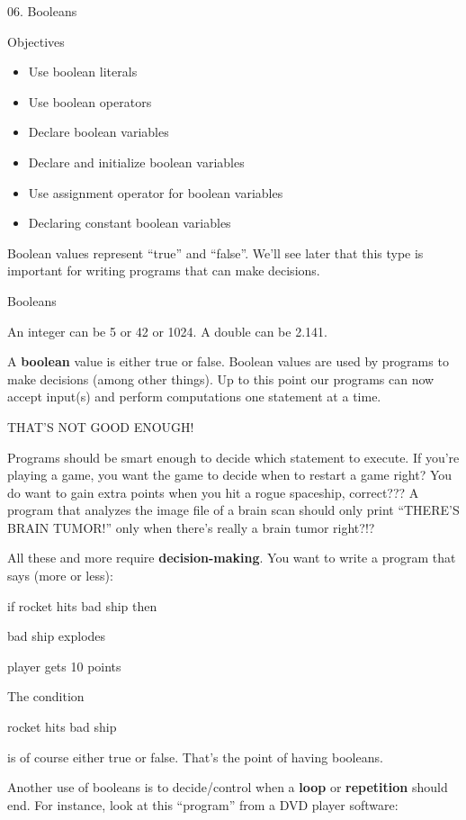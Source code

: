 \documentclass[
]{article}
\author{}
\date{}
\providecommand{\tightlist}{%
  \setlength{\itemsep}{0pt}\setlength{\parskip}{0pt}}
\begin{document}
06. Booleans

Objectives

\begin{itemize}
\tightlist
\item
  Use boolean literals
\item
  Use boolean operators
\item
  Declare boolean variables
\item
  Declare and initialize boolean variables
\item
  Use assignment operator for boolean variables
\item
  Declaring constant boolean variables
\end{itemize}

Boolean values represent ``true'' and ``false''. We'll see later that
this type is important for writing programs that can make decisions.

Booleans

An integer can be 5 or 42 or 1024. A double can be 2.141.

A \textbf{boolean} value is either true or false. Boolean values are
used by programs to make decisions (among other things). Up to this
point our programs can now accept input(s) and perform computations one
statement at a time.

THAT'S NOT GOOD ENOUGH!

Programs should be smart enough to decide which statement to execute. If
you're playing a game, you want the game to decide when to restart a
game right? You do want to gain extra points when you hit a rogue
spaceship, correct??? A program that analyzes the image file of a brain
scan should only print ``THERE'S BRAIN TUMOR!'' only when there's really
a brain tumor right?!?

All these and more require \textbf{decision-making}. You want to write a
program that says (more or less):

if rocket hits bad ship then

bad ship explodes

player gets 10 points

The condition

rocket hits bad ship

is of course either true or false. That's the point of having booleans.

Another use of booleans is to decide/control when a \textbf{loop} or
\textbf{repetition} should end. For instance, look at this ``program''
from a DVD player software:
\end{document}
